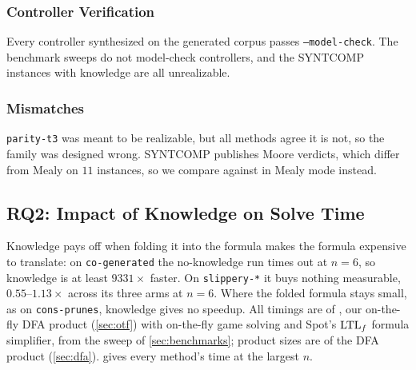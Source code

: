 \subsubsection{Controller Verification}

Every controller synthesized on the generated corpus passes \texttt{--model-check}.
The benchmark sweeps do not model-check controllers, and the SYNTCOMP instances with knowledge are all unrealizable.

\subsubsection{Mismatches}

\texttt{parity-t3} was meant to be realizable, but all methods agree it is not, so the family was designed wrong.
SYNTCOMP publishes Moore verdicts, which differ from Mealy on $11$ instances, so we compare against  in Mealy mode instead.

\subsection{RQ2: Impact of Knowledge on Solve Time}\label{sec:rq2}

Knowledge pays off when folding it into the formula makes the formula expensive to translate: on \texttt{co-generated} the no-knowledge run times out at $n = 6$, so knowledge is at least $9331\times$ faster.
On \texttt{slippery-*} it buys nothing measurable, $0.55$--$1.13\times$ across its three arms at $n = 6$.
Where the folded formula stays small, as on \texttt{cons-prunes}, knowledge gives no speedup.
All timings are of , our on-the-fly DFA product (\cref{sec:otf}) with on-the-fly game solving and Spot's $\text{LTL}_f$ formula simplifier, from the sweep of \cref{sec:benchmarks}; product sizes are of the DFA product (\cref{sec:dfa}).
 gives every method's time at the largest $n$.

\begin{table}[H]
\centering
\small

\caption{Median wall time in ms at the largest $n$; each cell is \emph{with knowledge} / \emph{without knowledge} (),  where any cell of the family timed out or failed (a median is only ever over every cell) and  where the family has no knowledge.  and  abbreviate the sweep subjects  and . The last column counts verdict mismatches against  over every $n$.}\label{tab:times}
\end{table}

